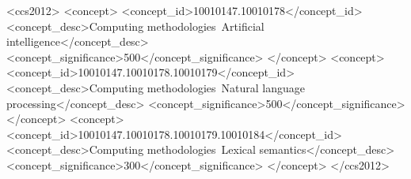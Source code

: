 \documentclass[sigconf]{acmart}
\begin{document}

\begin{CCSXML}
<ccs2012>
 <concept>
    <concept_id>10010147.10010178</concept_id>
    <concept_desc>Computing methodologies~Artificial intelligence</concept_desc>
    <concept_significance>500</concept_significance>
 </concept>
 <concept>
    <concept_id>10010147.10010178.10010179</concept_id>
    <concept_desc>Computing methodologies~Natural language processing</concept_desc>
    <concept_significance>500</concept_significance>
  </concept>
 <concept>
    <concept_id>10010147.10010178.10010179.10010184</concept_id>
    <concept_desc>Computing methodologies~Lexical semantics</concept_desc>
    <concept_significance>300</concept_significance>
 </concept>
</ccs2012>

\end{CCSXML}
\end{document}

